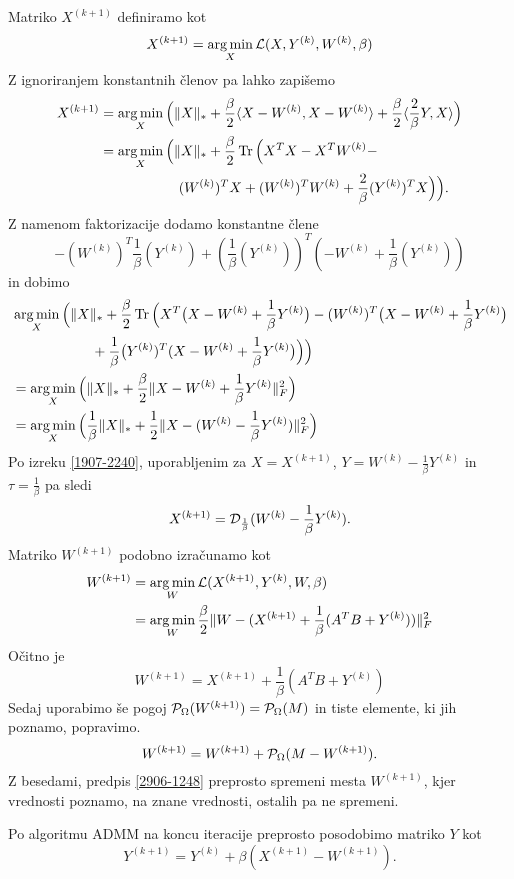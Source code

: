 Matriko $X^{(k+1)}$ definiramo kot
\[
    X^{(k+1)} = \operatorname*{arg\,min}_X \mathcal{L}(X, Y^{(k)}, W^{(k)}, \beta)
\]
Z ignoriranjem konstantnih členov pa lahko zapišemo
\begin{align*}
    X^{(k+1)} & = \operatorname*{arg\,min}_X \Big( \lVert X\rVert_* + \frac{\beta}{2}\langle X-W^{(k)}, X-W^{(k)} \rangle + \frac{\beta}{2}\langle \frac{2}{\beta}Y, X \rangle \Big) \\
              & = \operatorname*{arg\,min}_X \Big( \lVert X\rVert_* + \frac{\beta}{2}\operatorname{Tr}\Big(X^TX - X^TW^{(k)} -                                                   \\
              & \hspace{2cm} (W^{(k)})^TX + (W^{(k)})^TW^{(k)} + \frac{2}{\beta}(Y^{(k)})^TX \Big)\Big).
\end{align*}
Z namenom faktorizacije dodamo konstantne člene
\[-(W^{(k)})^T\frac{1}{\beta}(Y^{(k)}) + (\frac{1}{\beta}(Y^{(k)}))^T(-W^{(k)} + \frac{1}{\beta}(Y^{(k)}))\]
in dobimo
\begin{align*}
     & \operatorname*{arg\,min}_X \Big( \lVert X\rVert_* + \frac{\beta}{2}\operatorname{Tr}\Big(X^T\big(X - W^{(k)} + \frac{1}{\beta}Y^{(k)}\big) - (W^{(k)})^T \big(X - W^{(k)} + \frac{1}{\beta}Y^{(k)}\big) \\
     & \hspace{2cm} +\frac{1}{\beta}\big(Y^{(k)})^T(X - W^{(k)} + \frac{1}{\beta}Y^{(k)}\big)\Big) \Big)                                                                 \\
     & = \operatorname*{arg\,min}_X \Big( \lVert X\rVert_* + \frac{\beta}{2} \lVert X-W^{(k)} + \frac{1}{\beta}Y^{(k)}\rVert_F^2 \Big)                                                                        \\
     & = \operatorname*{arg\,min}_X \Big( \frac{1}{\beta}\lVert X\rVert_* +  \frac{1}{2}\lVert X-(W^{(k)} - \frac{1}{\beta}Y^{(k)})\rVert_F^2\Big)  
\end{align*}
Po izreku \ref{1907-2240}, uporabljenim za $X=X^{(k+1)}$, $Y=W^{(k)} - \frac{1}{\beta}Y^{(k)}$ in $\tau=\frac{1}{\beta}$ pa sledi
\[
    X^{(k+1)} = \mathcal{D}_\frac{1}{\beta}(W^{(k)} - \frac{1}{\beta} Y^{(k)}).
\]
Matriko $W^{(k+1)}$ podobno izračunamo kot
\begin{align*}
    W^{(k+1)} & = \operatorname*{arg\,min}_{W} \mathcal{L}(X^{(k+1)}, Y^{(k)}, W, \beta)                                   \\
              & = \operatorname*{arg\,min}_W \frac{\beta}{2} \lVert W - (X^{(k+1)} + \frac{1}{\beta}(A^T B + Y^{(k)})) \rVert_F^2
\end{align*}
Očitno je
\[
    W^{(k+1)} = X^{(k+1)} + \frac{1}{\beta}(A^T B + Y^{(k)})
\]
Sedaj uporabimo še pogoj $\mathcal{P}_\Omega(W^{(k+1)}) = \mathcal{P}_\Omega(M)$ in tiste elemente, ki jih poznamo, popravimo.
\begin{equation}
    \label{2906-1248}
    W^{(k+1)} = W^{(k+1)} + \mathcal{P}_\Omega(M - W^{(k+1)}).
\end{equation}
Z besedami, predpis \eqref{2906-1248}
preprosto spremeni mesta $W^{(k+1)}$, kjer vrednosti poznamo, na znane vrednosti, ostalih pa ne spremeni.

Po algoritmu ADMM \cite{admmForNNM} na koncu iteracije preprosto posodobimo matriko $Y$ kot
\[
    Y^{(k+1)} = Y^{(k)} + \beta(X^{(k+1)}- W^{(k+1)}).
\]

